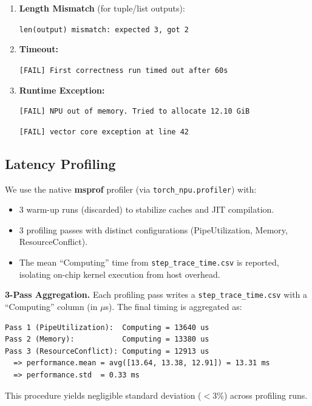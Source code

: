 \documentclass{article} %
\theoremstyle{definition}
\theoremstyle{remark}
\begin{document}
\begin{enumerate}[itemsep=6pt,parsep=0pt,topsep=4pt]
      \texttt{type(output) mismatch: expected Tensor, got list}

      \item \textbf{Length Mismatch} (for tuple/list outputs):
      \vspace{2pt} 

      \texttt{len(output) mismatch: expected 3, got 2}

      \item \textbf{Timeout:}
      \vspace{2pt} 

      \texttt{[FAIL] First correctness run timed out after 60s}

      \item \textbf{Runtime Exception:}
      \vspace{2pt} 

      \texttt{[FAIL] NPU out of memory. Tried to allocate 12.10 GiB}


      \texttt{[FAIL] vector core exception at line 42}
  \end{enumerate}

  \subsection{Latency Profiling}

  We use the native \textbf{msprof} profiler (via \texttt{torch\_npu.profiler}) with:
  \begin{itemize}
      \item 3 warm-up runs (discarded) to stabilize caches and JIT compilation.
      \item 3 profiling passes with distinct configurations (PipeUtilization, Memory, ResourceConflict).
      \item The mean ``Computing'' time from \texttt{step\_trace\_time.csv} is reported, isolating on-chip kernel execution from host overhead.
  \end{itemize}

  \textbf{3-Pass Aggregation.}
  Each profiling pass writes a \texttt{step\_trace\_time.csv} with a ``Computing'' column (in $\mu$s). The final timing is aggregated as:
  \begin{verbatim}
Pass 1 (PipeUtilization):  Computing = 13640 us
Pass 2 (Memory):           Computing = 13380 us
Pass 3 (ResourceConflict): Computing = 12913 us
  => performance.mean = avg([13.64, 13.38, 12.91]) = 13.31 ms
  => performance.std  = 0.33 ms
  \end{verbatim}
This procedure yields negligible standard deviation ($<$3\%) across profiling runs.
\end{document}
